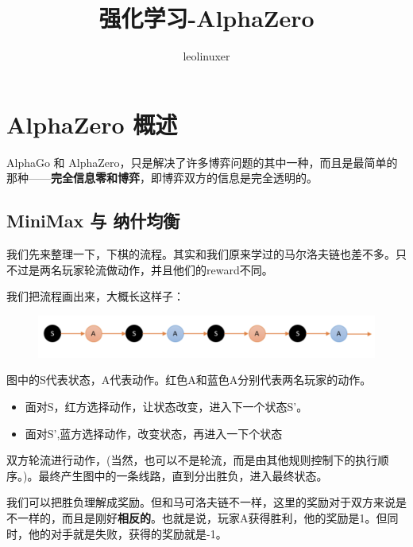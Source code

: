 \documentclass[12pt]{article}
\title{强化学习-AlphaZero\cite{AlphaZero_Theory_1}\cite{AlphaZero_Theory_2}\cite{AlphaZero_Theory_3}}
\author{leolinuxer}
\begin{document}
\maketitle
\tableofcontents


\section{AlphaZero 概述}
AlphaGo 和 AlphaZero，只是解决了许多博弈问题的其中一种，而且是最简单的那种——\textbf{完全信息零和博弈}，即博弈双方的信息是完全透明的。

\subsection{MiniMax 与 纳什均衡}
我们先来整理一下，下棋的流程。其实和我们原来学过的马尔洛夫链也差不多。只不过是两名玩家轮流做动作，并且他们的reward不同。

我们把流程画出来，大概长这样子：
\begin{figure}[H]
    \centering
    \includegraphics[width=1\textwidth]{fig/ReinforcementLearning/AlphaZero_Decision_Process_States.png}
\end{figure}

图中的S代表状态，A代表动作。红色A和蓝色A分别代表两名玩家的动作。

\begin{itemize}
\setlength{\itemsep}{0pt}
\setlength{\parsep}{0pt}
\setlength{\parskip}{0pt}
    \item 面对S，红方选择动作，让状态改变，进入下一个状态S'。
    \item 面对S',蓝方选择动作，改变状态，再进入一下个状态
\end{itemize}

双方轮流进行动作，(当然，也可以不是轮流，而是由其他规则控制下的执行顺序。)。最终产生图中的一条线路，直到分出胜负，进入最终状态。

我们可以把胜负理解成奖励。但和马可洛夫链不一样，这里的奖励对于双方来说是不一样的，而且是刚好\textbf{相反的}。也就是说，玩家A获得胜利，他的奖励是1。但同时，他的对手就是失败，获得的奖励就是-1。
\end{document}
